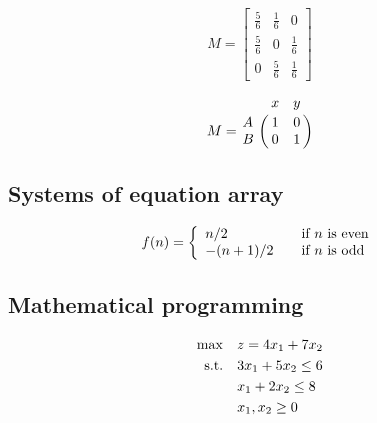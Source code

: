 \documentclass{article}
\begin{document}
$$
    M =
    \begin{bmatrix}
        \frac{5}{6} & \frac{1}{6} & 0           \\[0.3em]
        \frac{5}{6} & 0           & \frac{1}{6} \\[0.3em]
        0           & \frac{5}{6} & \frac{1}{6}
    \end{bmatrix}
$$

$$
    M = \bordermatrix{~ & x & y \cr
                      A & 1 & 0 \cr
                      B & 0 & 1 \cr}
$$


\subsection{Systems of equation array}\label{subsec:syseq}

\[
    f(n) = \left\{
    \begin{array}{l l}
        n/2      & \quad \text{if $n$ is even}\\
        -(n+1)/2 & \quad \text{if $n$ is odd}
    \end{array} \right.
\]


\subsection{Mathematical programming}\label{subsec:mathprog}

\begin{align}
    \max        & \quad z = 4 x_1 + 7 x_2    \notag \\
    \text{s.t.} & \quad 3 x_1 + 5 x_2 \leq 6 \label{constraint1}\\
                & \quad   x_1 + 2 x_2 \leq 8 \label{constraint2}\\
                & \quad   x_1, x_2 \geq 0    \notag
\end{align}




\end{document}

